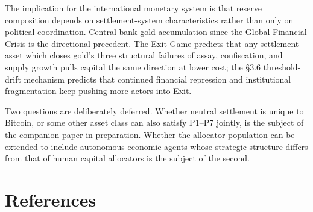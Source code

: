 \documentclass[12pt]{article}
\theoremstyle{definition}
\theoremstyle{remark}
\begin{document}
The implication for the international monetary system is that reserve composition depends on settlement-system characteristics rather than only on political coordination. Central bank gold accumulation since the Global Financial Crisis is the directional precedent. The Exit Game predicts that any settlement asset which closes gold's three structural failures of assay, confiscation, and supply growth pulls capital the same direction at lower cost; the \S3.6 threshold-drift mechanism predicts that continued financial repression and institutional fragmentation keep pushing more actors into Exit.

Two questions are deliberately deferred. Whether neutral settlement is unique to Bitcoin, or some other asset class can also satisfy P1--P7 jointly, is the subject of the companion paper in preparation. Whether the allocator population can be extended to include autonomous economic agents whose strategic structure differs from that of human capital allocators is the subject of the second.

\clearpage
\section{References}
\end{document}
